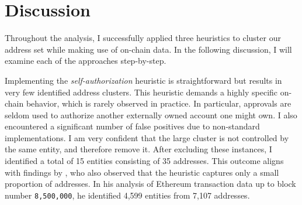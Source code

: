 \documentclass[12pt,a4paper,titlepage,oneside,english]{article}
\begin{document}

\section{Discussion}
Throughout the analysis, I successfully applied three heuristics to cluster our address set while making use of on-chain data. In the following discussion, I will examine each of the approaches step-by-step.

Implementing the \textit{self-authorization} heuristic is straightforward but results in very few identified address clusters. This heuristic demands a highly specific on-chain behavior, which is rarely observed in practice. In particular, approvals are seldom used to authorize another externally owned account one might own. I also encountered a significant number of false positives due to non-standard implementations. I am very confident that the large cluster is not controlled by the same entity, and therefore remove it. After excluding these instances, I identified a total of 15 entities consisting of 35 addresses. This outcome aligns with findings by \cite{FV:17}, who also observed that the heuristic captures only a small proportion of addresses. In his analysis of Ethereum transaction data up to block number \texttt{8,500,000}, he identified 4,599 entities from 7,107 addresses.
\end{document}
